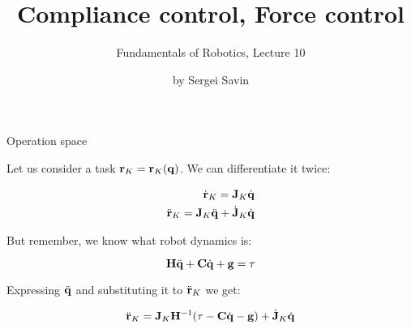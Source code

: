 \documentclass{beamer}
\title{Compliance control, Force control}
\subtitle{Fundamentals of Robotics, Lecture 10}
\author{by Sergei Savin}
\date{\mydate}
\begin{document}
\maketitle





\begin{frame}{Operation space}
	\begin{flushleft}
		
		Let us consider a task $\mathbf{r}_K = \mathbf{r}_K(\mathbf{q})$. We can differentiate it twice:
		
		\begin{align}
			\dot{\mathbf{r}}_K = \mathbf{J}_K \dot{\mathbf{q}} \\
			\ddot{\mathbf{r}}_K = \mathbf{J}_K \ddot{\mathbf{q}} + \dot{\mathbf{J}}_K \dot{\mathbf{q}} 
	    \end{align}
    
    	But remember, we know what robot dynamics is:
    	
        \begin{equation}
    		\mathbf{H} \ddot{\mathbf{q}} + \mathbf{C} \dot{\mathbf{q}} + \mathbf{g} = \tau
    	\end{equation}
    	
    	Expressing $ \ddot{\mathbf{q}}$ and substituting it to $\ddot{\mathbf{r}}_K$ we get:
    	
    	\begin{align}
    		\ddot{\mathbf{r}}_K = \mathbf{J}_K \mathbf{H}^{-1} (\tau - \mathbf{C} \dot{\mathbf{q}} - \mathbf{g}) + \dot{\mathbf{J}}_K \dot{\mathbf{q}} 
    	\end{align}
    	
		
	\end{flushleft}
\end{frame}
\end{document}
